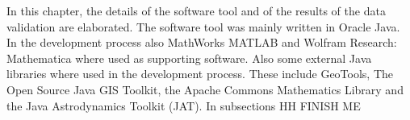 In this chapter, the details of the software tool and of the results of the data validation are elaborated. The software tool was mainly written in Oracle Java. In the development process also MathWorks MATLAB and Wolfram Research: Mathematica where used as supporting software. Also some external Java libraries where used in the development process. These include GeoTools, The Open Source Java GIS Toolkit, the Apache Commons Mathematics Library and the Java Astrodynamics Toolkit (JAT). In subsections HH FINISH ME
